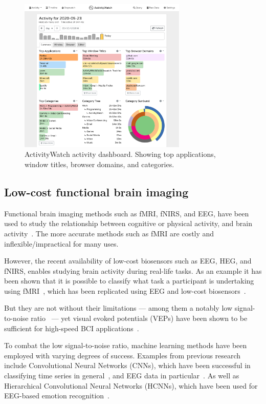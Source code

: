 \documentclass{IEEEtran}
\begin{document}
\begin{refsection}
\begin{figure}[h]
\centering
\includegraphics[width=8cm]{img/screenshot-aw-activity.png}
\caption{ActivityWatch activity dashboard. Showing top applications, window titles, browser domains, and categories.}\label{fig:aw}
\end{figure}


\subsection{Low-cost functional brain imaging}

Functional brain imaging methods such as fMRI, fNIRS, and EEG, have been used to study the relationship between cognitive or physical activity, and brain activity~\cite{floyd_decoding_2017}\cite{hong_classification_2015}\cite{fucci_replication_2019}. The more accurate methods such as fMRI are costly and inflexible/impractical for many uses.

However, the recent availability of low-cost biosensors such as EEG, HEG, and fNIRS, enables studying brain activity during real-life tasks. As an example it has been shown that it is possible to classify what task a participant is undertaking using fMRI~\cite{floyd_decoding_2017}, which has been replicated using EEG and low-cost biosensors~\cite{fucci_replication_2019}.

But they are not without their limitations --- among them a notably low signal-to-noise ratio~\cite{mcfarland_eeg-based_2017} --- yet visual evoked potentials (VEPs) have been shown to be sufficient for high-speed BCI applications~\cite{spuler_high-speed_2017}.

To combat the low signal-to-noise ratio, machine learning methods have been employed with varying degrees of success. Examples from previous research include Convolutional Neural Networks (CNNs), which have been successful in classifying time series in general~\cite{zhao_convolutional_2017}, and EEG data in particular~\cite{schirrmeister_deep_2017}. As well as Hierarchical Convolutional Neural Networks (HCNNs), which have been used for EEG-based emotion recognition~\cite{li_hierarchical_2018}.


\end{refsection}
\end{document}
